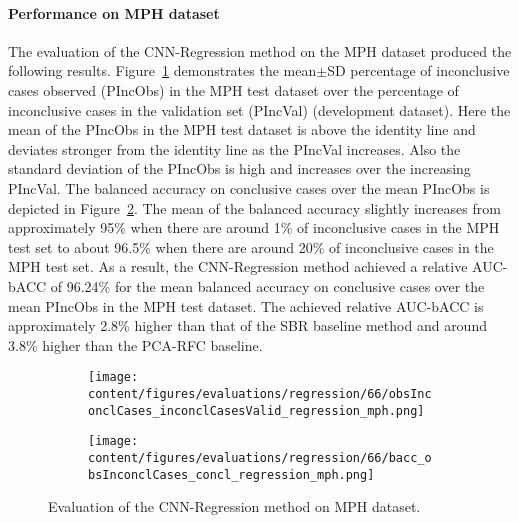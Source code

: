 
\paragraph{Performance on MPH dataset}

The evaluation of the CNN-Regression method on the MPH dataset produced the following results.
Figure~\ref{fig:obsInconclCases_inconclCasesValid_regression_mph} demonstrates
the mean$\pm$SD percentage of inconclusive cases observed (PIncObs) in the MPH test dataset 
over the percentage of inconclusive cases in the validation set (PIncVal) (development dataset).
Here the mean of the PIncObs in the MPH test dataset is above the identity line 
and deviates stronger from the identity line as the PIncVal increases.
Also the standard deviation of the PIncObs is high and increases over the increasing PIncVal.
The balanced accuracy on conclusive cases over the mean PIncObs 
is depicted in Figure~\ref{fig:bacc_obsInconclCases_concl_regression_mph}.
The mean of the balanced accuracy slightly increases from approximately 95\% 
when there are around 1\% of inconclusive cases in the MPH test set to about 96.5\% 
when there are around 20\% of inconclusive cases in the MPH test set.
As a result, the CNN-Regression method achieved a relative AUC-bACC of 96.24\% for the mean balanced accuracy on conclusive cases 
over the mean PIncObs in the MPH test dataset.
The achieved relative AUC-bACC is approximately 2.8\% higher than that of the SBR baseline method 
and around 3.8\% higher than the PCA-RFC baseline.


\begin{figure}[ht]
  \begin{subfigure}{0.49\textwidth}
    \centering
    \texttt{[image: content/figures/evaluations/regression/66/obsInconclCases\_inconclCasesValid\_regression\_mph.png]}
    \label{fig:obsInconclCases_inconclCasesValid_regression_mph}
  \end{subfigure}
  \hfill
  \begin{subfigure}{0.49\textwidth}
    \centering
    \texttt{[image: content/figures/evaluations/regression/66/bacc\_obsInconclCases\_concl\_regression\_mph.png]}
    \label{fig:bacc_obsInconclCases_concl_regression_mph}
  \end{subfigure}
  \caption{Evaluation of the CNN-Regression method on MPH dataset.}
  \label{fig:perf_regression_mph}
\end{figure}


